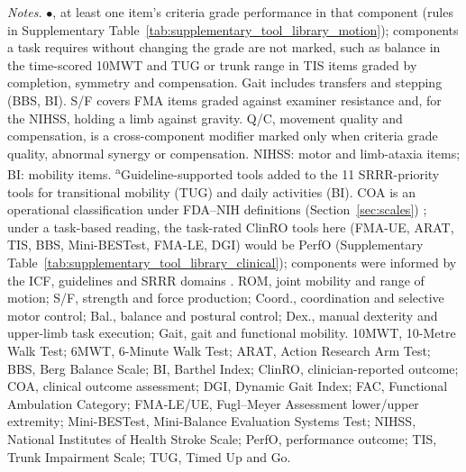\begin{table}[!htbp]
\vspace{3pt}
\begin{minipage}{\linewidth}
\footnotesize
\textit{Notes.} \(\bullet\), at least one item's criteria grade performance in that component (rules in Supplementary Table~\ref{tab:supplementary_tool_library_motion}); components a task requires without changing the grade are not marked, such as balance in the time-scored 10MWT and TUG or trunk range in TIS items graded by completion, symmetry and compensation. Gait includes transfers and stepping (BBS, BI). S/F covers FMA items graded against examiner resistance and, for the NIHSS, holding a limb against gravity. Q/C, movement quality and compensation, is a cross-component modifier marked only when criteria grade quality, abnormal synergy or compensation. NIHSS: motor and limb-ataxia items; BI: mobility items. \textsuperscript{a}Guideline-supported tools added to the 11 SRRR-priority tools for transitional mobility (TUG) and daily activities (BI). COA is an operational classification under FDA--NIH definitions (Section~\ref{sec:scales}) \cite{FDANIH2016BESTCOA,Walton2015COAConceptualFoundation}; under a task-based reading, the task-rated ClinRO tools here (FMA-UE, ARAT, TIS, BBS, Mini-BESTest, FMA-LE, DGI) would be PerfO (Supplementary Table~\ref{tab:supplementary_tool_library_clinical}); components were informed by the ICF, guidelines and SRRR domains \cite{WHO2001ICF,S1Winstein2016AHAASARehab,S1VADoD2024StrokeRehab,S1NICE2023NG236,CoreKwakkel2017SRRRSensorimotor,CoreKwakkel2019SRRRUpperLimb,CoreVanCriekinge2024SRRRBalanceMobility}.
ROM, joint mobility and range of motion; S/F, strength and force production; Coord., coordination and selective motor control; Bal., balance and postural control; Dex., manual dexterity and upper-limb task execution; Gait, gait and functional mobility.
10MWT, 10-Metre Walk Test; 6MWT, 6-Minute Walk Test; ARAT, Action Research Arm Test; BBS, Berg Balance Scale; BI, Barthel Index; ClinRO, clinician-reported outcome; COA, clinical outcome assessment; DGI, Dynamic Gait Index; FAC, Functional Ambulation Category; FMA-LE/UE, Fugl--Meyer Assessment lower/upper extremity; Mini-BESTest, Mini-Balance Evaluation Systems Test; NIHSS, National Institutes of Health Stroke Scale; PerfO, performance outcome; TIS, Trunk Impairment Scale; TUG, Timed Up and Go.
\end{minipage}
\endgroup
\end{table}
